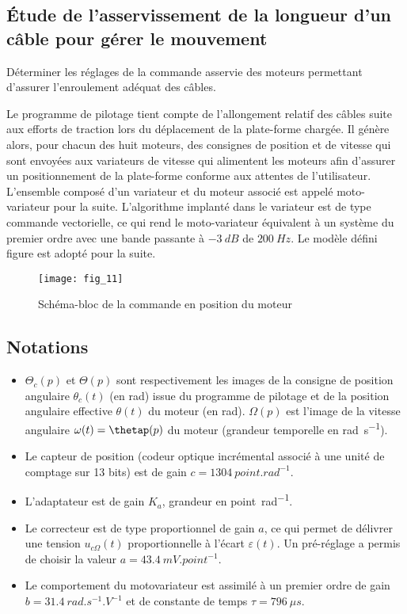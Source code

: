 \subsection*{Étude de l’asservissement de la longueur d’un câble pour gérer le mouvement}

\begin{obj}
Déterminer les réglages de la commande asservie des moteurs permettant d’assurer l’enroulement
 adéquat des câbles.
\end{obj}

\ifprof
\else
Le programme de pilotage tient compte de l’allongement relatif des câbles suite aux efforts de traction lors du déplacement de la plate-forme chargée. Il génère alors, pour chacun des huit moteurs, des consignes de position et de vitesse qui sont envoyées aux variateurs de vitesse qui alimentent les moteurs afin d’assurer un positionnement de la plate-forme conforme aux attentes de l’utilisateur.
L’ensemble composé d’un variateur et du moteur associé est appelé moto-variateur pour la suite. L’algorithme implanté dans le variateur est de type commande vectorielle, ce qui rend le moto-variateur équivalent à un  système du premier ordre avec une bande passante à $-\SI{3}{dB}$ de $\SI{200}{Hz}$.
 Le modèle défini figure \label{Cy_02_Ch_04_TD_01_fig_11} est adopté pour la suite.
 
 \begin{figure} [!h]
\centering
\texttt{[image: fig\_11]}
\caption{Schéma-bloc de la commande en position du moteur \label{Cy_02_Ch_04_TD_01_fig_11}}
\end{figure}

\subsection*{Notations}

\begin{itemize}
\item $\Theta_c(p)$ et $\Theta(p)$ sont respectivement les images de la consigne de position angulaire $\theta_c(t)$ (en rad) issue du programme de pilotage et de la position angulaire effective $\theta(t)$ du moteur (en \si{rad}). $\Omega(p)$ est l’image de la vitesse angulaire $\omega(t)=\thetap(p)$ du moteur (grandeur temporelle en \si{rad.s^{-1}}).
 \item Le capteur de position (codeur optique incrémental associé à une unité de comptage sur 13 bits) est de gain $c=\SI{1304}{point.rad^{-1}}$.
 \item L’adaptateur est de gain $K_a$, grandeur en \si{point.rad^{-1}}.
  \item Le correcteur est de type proportionnel de gain $a$, ce qui permet de délivrer une tension $u_{c\Omega}(t)$ proportionnelle à l’écart $\varepsilon(t)$. Un pré-réglage a permis de choisir la valeur $a=\SI{43,4}{mV.point^{-1}}$.
\item Le comportement du motovariateur est assimilé à un premier ordre de gain $b=\SI{31,4}{rad.s^{-1}.V^{-1}}$ et de constante de temps $\tau = \SI{796}{\mu s}$.
\end{itemize}
\fi


